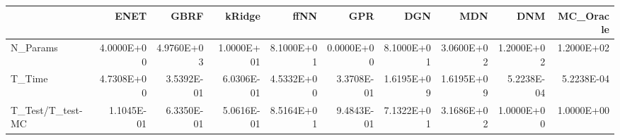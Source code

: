 \begin{tabular}{lrrrrrrrrr}
\toprule
{} &       ENET &       GBRF &     kRidge &       ffNN &        GPR &        DGN &        MDN &        DNM &  MC\_Oracle \\
\midrule
N\_Params         & 4.0000E+00 & 4.9760E+03 & 1.0000E+01 & 8.1000E+01 & 0.0000E+00 & 8.1000E+01 & 3.0600E+02 & 1.2000E+02 & 1.2000E+02 \\
T\_Time           & 4.7308E+00 & 3.5392E-01 & 6.0306E-01 & 4.5332E+00 & 3.3708E-01 & 1.6195E+09 & 1.6195E+09 & 5.2238E-04 & 5.2238E-04 \\
T\_Test/T\_test-MC & 1.1045E-01 & 6.3350E-01 & 5.0616E-01 & 8.5164E+01 & 9.4843E-01 & 7.1322E+01 & 3.1686E+02 & 1.0000E+00 & 1.0000E+00 \\
\bottomrule
\end{tabular}
